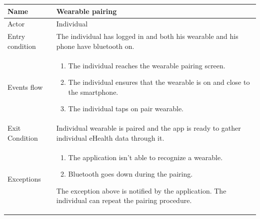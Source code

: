 \begin{table}[p]
\centering
\begin{tabular}{|l|p{11cm}|}
    \hline
    Name & Wearable pairing
    \\ \hline
    Actor & Individual
    \\ \hline 
    Entry condition & The individual has logged in and both his wearable and his phone have bluetooth on.
    \\ \hline
    Events flow &
    \begin{enumerate}
    \item The individual reaches the wearable pairing screen.
    \item The individual ensures that the wearable is on and close to the smartphone.
    \item The individual taps on pair wearable.
    \end{enumerate}
     \\ \hline
     Exit Condition & Individual wearable is paired and the app is ready to gather individual eHealth data through it.
     \\
    \hline
    Exceptions &
        \begin{enumerate}
    \item The application isn't able to recognize a wearable. 
   	\item Bluetooth goes down during the pairing.
    \end{enumerate}
    The exception above is notified by the application. The individual can repeat the pairing procedure.
      \\
    \hline

\end{tabular}
\end{table}


